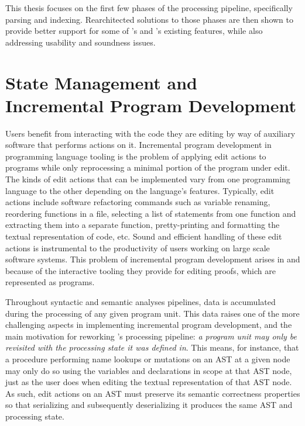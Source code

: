 This thesis focuses on the first few phases of the \Beluga processing pipeline, specifically parsing and indexing.
Rearchitected solutions to those phases are then shown to provide better support for some of \Beluga's and \Harpoon's existing features, while also addressing usability and soundness issues.

\section{State Management and Incremental Program Development}\label{section:intro-state-management}

Users benefit from interacting with the code they are editing by way of auxiliary software that performs actions on it.
Incremental program development in programming language tooling is the problem of applying edit actions to programs while only reprocessing a minimal portion of the program under edit.
The kinds of edit actions that can be implemented vary from one programming language to the other depending on the language's features.
Typically, edit actions include software refactoring commands such as variable renaming, reordering functions in a file, selecting a list of statements from one function and extracting them into a separate function, pretty-printing and formatting the textual representation of code, etc.
Sound and efficient handling of these edit actions is instrumental to the productivity of users working on large scale software systems.
This problem of incremental program development arises in \Beluga and \Harpoon because of the interactive tooling they provide for editing proofs, which are represented as programs.


Throughout syntactic and semantic analyses pipelines, data is accumulated during the processing of any given program unit.
This data raises one of the more challenging aspects in implementing incremental program development, and the main motivation for reworking \Beluga's processing pipeline: \textit{a program unit may only be revisited with the processing state it was defined in}.
This means, for instance, that a procedure performing name lookups or mutations on an \ac{AST} at a given node may only do so using the variables and declarations in scope at that \ac{AST} node, just as the user does when editing the textual representation of that \ac{AST} node.
As such, edit actions on an \ac{AST} must preserve its semantic correctness properties so that serializing and subsequently deserializing it produces the same \ac{AST} and processing state.

